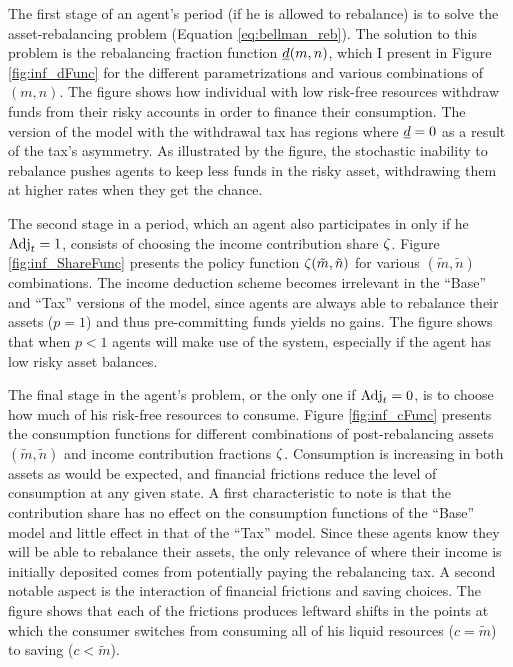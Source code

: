 \documentclass[./RiskyContrib.tex]{subfiles}
\begin{document}


The first stage of an agent's period (if he is allowed to rebalance) is to
solve the asset-rebalancing problem (Equation \ref{eq:bellman_reb}). The solution
to this problem is the rebalancing fraction function $\underline{d}(m,n)$, which I present
in Figure \ref{fig:inf_dFunc} for the different parametrizations and various
combinations of $(m,n)$. The figure shows how individual with low risk-free resources
withdraw funds from their risky accounts in order to finance their consumption.
The version of the model with the withdrawal tax has regions where $\underline{d} = 0$ as
a result of the tax's asymmetry. As illustrated by the figure, the stochastic
inability to rebalance pushes agents to keep less funds in the risky asset, withdrawing
them at higher rates when they get the chance.



The second stage in a period, which an agent also participates in only if
he $\text{Adj}_t = 1$, consists of choosing the income contribution share $\zeta$.
Figure \ref{fig:inf_ShareFunc} presents the policy function $\zeta(\tilde{m},\tilde{n})$
for various $(\tilde{m},\tilde{n})$ combinations. The income deduction scheme
becomes irrelevant in the ``Base'' and ``Tax'' versions of the model, since
agents are always able to rebalance their assets ($p=1$) and thus pre-committing
funds yields no gains. The figure shows that when $p<1$ agents will
make use of the system, especially if the agent has low risky asset balances.



The final stage in the agent's problem, or the only one if $\text{Adj}_t=0$, is
to choose how much of his risk-free resources to consume. Figure \ref{fig:inf_cFunc}
presents the consumption functions for different combinations of post-rebalancing
assets $(\tilde{m}, \tilde{n})$ and income contribution fractions $\zeta$. Consumption
is increasing in both assets as would be expected, and financial frictions reduce the
level of consumption at any given state. A first characteristic to note is that
the contribution share has no effect on the consumption functions of the ``Base'' model
and little effect in that of the ``Tax'' model. Since these agents know they will be
able to rebalance their assets, the only relevance of where their income is initially
deposited comes from potentially paying the rebalancing tax. A second notable aspect is
the interaction of financial frictions and saving choices. The figure shows that each
of the frictions produces leftward shifts in the points at which the consumer switches
from consuming all of his liquid resources ($c = \tilde{m}$) to saving ($c < \tilde{m}$).
\end{document}
